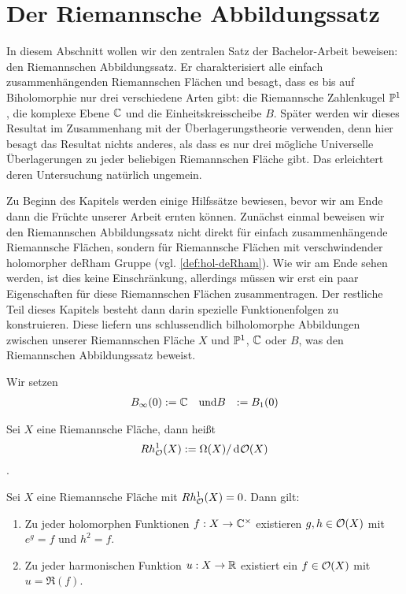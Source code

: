 \section{Der Riemannsche Abbildungssatz}
\label{sec:RMT}

In diesem Abschnitt wollen wir den zentralen Satz der Bachelor-Arbeit
beweisen: den Riemannschen Abbildungssatz. Er charakterisiert alle
einfach zusammenhängenden Riemannschen Flächen und besagt,
dass es bis auf Biholomorphie nur drei verschiedene Arten gibt: die
Riemannsche Zahlenkugel $\P^1$, die komplexe Ebene $\C$
und die Einheitskreisscheibe $B$.
Später werden wir dieses Resultat im Zusammenhang mit der
Überlagerungstheorie verwenden, denn hier besagt das Resultat nichts
anderes, als dass es nur drei mögliche Universelle Überlagerungen zu
jeder beliebigen Riemannschen Fläche gibt. Das erleichtert deren
Untersuchung natürlich ungemein.

Zu Beginn des Kapitels werden einige Hilfssätze bewiesen, bevor wir am
Ende dann die Früchte unserer Arbeit ernten können. Zunächst einmal
beweisen wir den Riemannschen Abbildungssatz nicht
direkt für einfach zusammenhängende Riemannsche Flächen, sondern für
Riemannsche Flächen mit verschwindender holomorpher deRham Gruppe
(vgl. \ref{def:hol-deRham}). Wie wir am Ende sehen werden, ist dies
keine Einschränkung, allerdings müssen wir erst ein paar Eigenschaften
für diese Riemannschen Flächen zusammentragen. Der restliche Teil
dieses Kapitels besteht dann darin spezielle Funktionenfolgen
zu konstruieren. Diese liefern uns schlussendlich bilholomorphe
Abbildungen zwischen unserer Riemannschen Fläche $X$ und $\P^1$, $\C$
oder $B$, was den Riemannschen Abbildungssatz beweist.


\begin{defin}
  Wir setzen
  \begin{align*}
    B_\infty(0) & := \C  && \text{und}
    B & := B_1(0)
  \end{align*}
\end{defin}



\begin{defin}
  \label{def:hol-deRham}
  Sei $X$ eine Riemannsche Fläche, dann heißt
  \[
  Rh_\hol^1(X) := \Omega(X)/\d[\hol(X)]
  \]
  .
\end{defin}

\begin{lemma}
  \label{lemma:ex-log}
  Sei $X$ eine Riemannsche Fläche mit $Rh^1_\hol(X) = 0$. Dann gilt:
  \begin{enumerate}
  \item Zu jeder holomorphen Funktionen $f: X \ra \C^\times$ existieren
    $g, h \in \hol(X)$ mit $e^g = f$ und $h^2 = f$.
  \item Zu jeder harmonischen Funktion $u: X \ra \R$ existiert ein $f
    \in \hol(X)$ mit $u = \Re(f)$.
  \end{enumerate}
\end{lemma}

